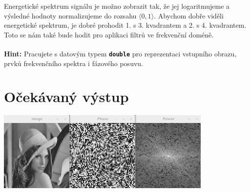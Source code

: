 \documentclass[12pt]{article}
\begin{document}
Energetické spektrum signálu je možno zobrazit tak, že jej logaritmujeme a výsledné hodnoty normalizujeme do rozsahu $\langle 0, 1\rangle$.
Abychom dobře viděli energetické spektrum, je dobré prohodit 1. s 3. kvadrantem a 2. s 4. kvadrantem.
Toto se nám také bude hodit pro aplikaci filtrů ve frekvenční doméně.
\\
\\
\textbf{Hint:} Pracujete s datovým typem \textbf{\texttt{double}} pro reprezentaci vstupního obrazu, prvků frekvenčního spektra i fázového posuvu.

\section*{Očekávaný výstup}

\begin{center}
\includegraphics[width=0.8\textwidth]{result_images.png}
\end{center}
\end{document}
